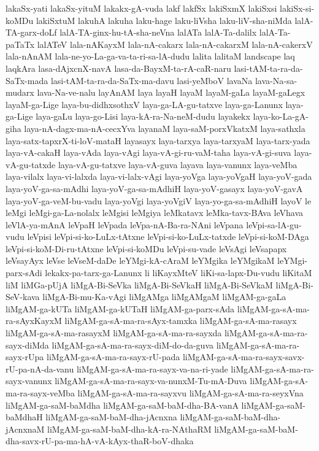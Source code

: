 {lakaSx-yati
lakaSx-yituM
lakakx-gA-vuda
lakf
lakfSx
lakiSxmX
lakiSxsi
lakiSx-si-koMDu
lakiSxtuM
lakuhA
lakuha
laku-hage
laku-liVsha
laku-liV-sha-niMda
lalA-TA-garx-doLf
lalA-TA-ginx-hu-tA-sha-neVna
lalATa
lalA-Ta-dalilx
lalA-Ta-paTaTx
lalATeV
lala-nAKayxM
lala-nA-cakarx
lala-nA-cakarxM
lala-nA-cakerxV
lala-nAnAM
lala-ne-yo-La-ga-va-ta-ri-sa-lA-dudu
lalita
lalitaM
landscape
laq
laqkAra
lasa-dAjxcnX-navA
lasa-da-BayxM-ta-rA-caR-naru
lasi-tAM-ta-ra-da-SaTx-mada
lasi-tAM-ta-ra-da-SaTx-ma-davu
lasi-yeMboV
lavaNa
lava-Na-sa-mudarx
lava-Na-ve-nalu
layAnAM
laya
layaH
layaM
layaM-gaLa
layaM-gaLegx
layaM-ga-Lige
laya-bu-didhxsothxV
laya-ga-LA-gu-tatxve
laya-ga-Lanunx
laya-ga-Lige
laya-gaLu
laya-go-Lisi
laya-kA-ra-Na-neM-dudu
layakekx
laya-ko-La-gA-giha
laya-nA-dagx-ma-nA-cecxYva
layanaM
laya-saM-porxVkatxM
laya-sathxla
laya-satx-tapxrX-ti-loV-mataH
layasayx
laya-tarxya
laya-tarxyaM
laya-tarx-yada
laya-vA-cakaH
laya-vAda
laya-vAgi
laya-vA-gi-ru-vaM-taha
laya-vA-gi-suva
laya-vA-gu-tatxde
laya-vA-gu-tatxve
laya-vA-guva
layava
laya-vanunx
laya-veMba
laya-vilalx
laya-vi-lalxda
laya-vi-lalx-vAgi
laya-yoVga
laya-yoVgaH
laya-yoV-gada
laya-yoV-ga-sa-mAdhi
laya-yoV-ga-sa-mAdhiH
laya-yoV-gasayx
laya-yoV-gavA
laya-yoV-ga-veM-bu-vadu
laya-yoVgi
laya-yoVgiV
laya-yo-ga-sa-mAdhiH
layoV
le
leMgi
leMgi-ga-La-nolalx
leMgisi
leMgiya
leMkatavx
leMka-tavx-BAva
leVhava
leVlA-ya-mAnA
leVpaH
leVpada
leVpa-nA-Ba-ra-NAni
leVpana
leVpi-sa-lA-gu-vudu
leVpisi
leVpi-si-ko-LuLx-tAtxne
leVpi-si-ko-LuLx-tatxde
leVpi-si-koM-DAga
leVpi-si-koM-Di-ru-tAtxne
leVpi-si-koMDu
leVpi-su-vade
leVsAgi
leVsapapx
leVsayAyx
leVse
leVseM-daDe
leYMgi-kA-cAraM
leYMgika
leYMgikaM
leYMgi-parx-sAdi
lekakx-pa-tarx-ga-Lanunx
li
liKayxMteV
liKi-sa-lapx-Du-vudu
liKitaM
liM
liMGa-pUjA
liMgA-Bi-SeVka
liMgA-Bi-SeVkaH
liMgA-Bi-SeVkaM
liMgA-Bi-SeV-kava
liMgA-Bi-mu-Ka-vAgi
liMgAMga
liMgAMgaM
liMgAM-ga-gaLa
liMgAM-ga-kUTa
liMgAM-ga-kUTaH
liMgAM-ga-parx-sAda
liMgAM-ga-sA-ma-ra-sAyxKayxM
liMgAM-ga-sA-ma-ra-sAyx-tamxka
liMgAM-ga-sA-ma-rasayx
liMgAM-ga-sA-ma-rasayxM
liMgAM-ga-sA-ma-ra-sayxda
liMgAM-ga-sA-ma-ra-sayx-diMda
liMgAM-ga-sA-ma-ra-sayx-diM-do-da-guva
liMgAM-ga-sA-ma-ra-sayx-rUpa
liMgAM-ga-sA-ma-ra-sayx-rU-pada
liMgAM-ga-sA-ma-ra-sayx-savx-rU-pa-nA-da-vanu
liMgAM-ga-sA-ma-ra-sayx-va-na-ri-yade
liMgAM-ga-sA-ma-ra-sayx-vanunx
liMgAM-ga-sA-ma-ra-sayx-va-nunxM-Tu-mA-Duva
liMgAM-ga-sA-ma-ra-sayx-veMba
liMgAM-ga-sA-ma-ra-sayxvu
liMgAM-ga-sA-ma-ra-seyxVna
liMgAM-ga-saM-baMdha
liMgAM-ga-saM-baM-dha-BA-vanA
liMgAM-ga-saM-baMdhaH
liMgAM-ga-saM-baM-dha-jAcnxna
liMgAM-ga-saM-baM-dha-jAcnxnaM
liMgAM-ga-saM-baM-dha-kA-ra-NAthaRM
liMgAM-ga-saM-baM-dha-savx-rU-pa-ma-hA-vA-kAyx-thaR-boV-dhaka
}
